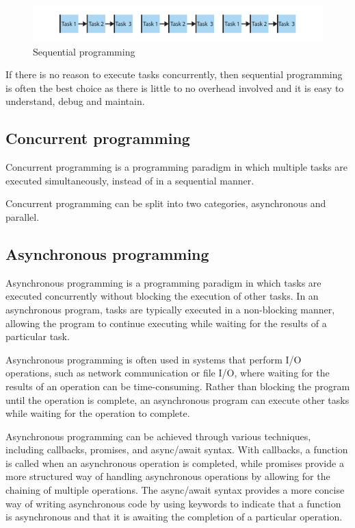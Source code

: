 \begin{figure}[H]
    \centering
    \includegraphics[width=\textwidth]{figures/concurrency/sequential.pdf}
    \caption{Sequential programming}
    \label{fig:concurrency_sequential}
\end{figure}

If there is no reason to execute tasks concurrently, then sequential programming is often the best choice as there is little to no overhead involved and it is easy to understand, debug and maintain.

\subsection{Concurrent programming}
Concurrent programming is a programming paradigm in which multiple tasks are executed simultaneously, instead of in a sequential manner.


Concurrent programming can be split into two categories, asynchronous and parallel.


\subsection{Asynchronous programming}
Asynchronous programming is a programming paradigm in which tasks are executed concurrently without blocking the execution of other tasks.
In an asynchronous program, tasks are typically executed in a non-blocking manner, allowing the program to continue executing while waiting for the results of a particular task.

Asynchronous programming is often used in systems that perform I/O operations, such as network communication or file I/O, where waiting for the results of an operation can be time-consuming.
Rather than blocking the program until the operation is complete, an asynchronous program can execute other tasks while waiting for the operation to complete.

Asynchronous programming can be achieved through various techniques, including callbacks, promises, and async/await syntax.
With callbacks, a function is called when an asynchronous operation is completed, while promises provide a more structured way of handling asynchronous operations by allowing for the chaining of multiple operations.
The async/await syntax provides a more concise way of writing asynchronous code by using keywords to indicate that a function is asynchronous and that it is awaiting the completion of a particular operation.

